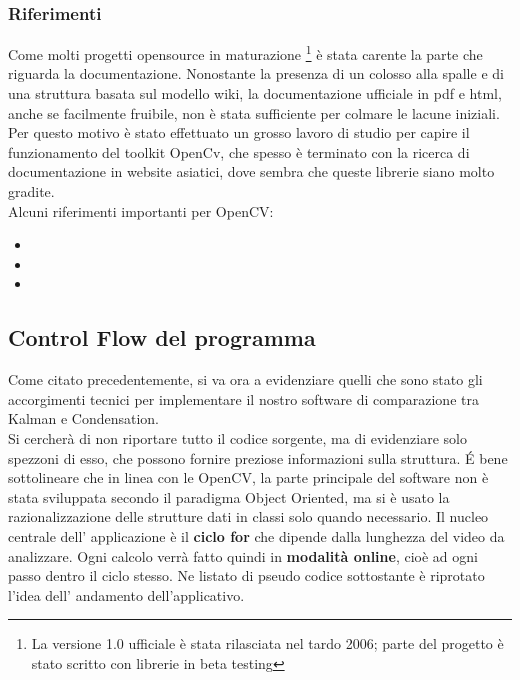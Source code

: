 



\subsubsection{Riferimenti}

Come molti progetti opensource in maturazione \footnote{La versione 1.0 ufficiale è stata rilasciata nel tardo 2006; parte del progetto è stato scritto con librerie in beta testing} è stata carente la parte che riguarda la documentazione. Nonostante la presenza di un colosso alla spalle e di una struttura basata sul modello wiki, la documentazione ufficiale in pdf e html, anche se facilmente fruibile, non è stata sufficiente per colmare le lacune iniziali. Per questo motivo è stato effettuato un grosso lavoro di studio per capire il funzionamento del toolkit OpenCv, che spesso è terminato con la ricerca di documentazione in website asiatici, dove sembra che queste librerie siano molto gradite.\\
Alcuni riferimenti importanti per OpenCV:
\begin{itemize}
 \item {}
\item {}
\item {}
\end{itemize}

 
\subsection{Control Flow del programma}\label{ControlFlow}
Come citato precedentemente, si va ora a evidenziare quelli che sono stato gli accorgimenti tecnici per implementare il nostro software di comparazione tra Kalman e Condensation.\\
Si cercherà di non riportare tutto il codice sorgente, ma di evidenziare solo spezzoni di esso, che possono fornire preziose informazioni sulla struttura. \'E bene sottolineare che in linea con le OpenCV, la parte principale del software non è stata sviluppata secondo il paradigma Object Oriented, ma si è usato la razionalizzazione delle strutture dati in classi solo quando necessario.
Il nucleo centrale dell' applicazione è il \textbf{ciclo for} che dipende dalla lunghezza del video da analizzare. Ogni calcolo verrà fatto quindi in \textbf{modalità online}, cioè ad ogni passo dentro il ciclo stesso. Ne listato di pseudo codice sottostante è riprotato l'idea dell' andamento dell'applicativo. 
\newpage

